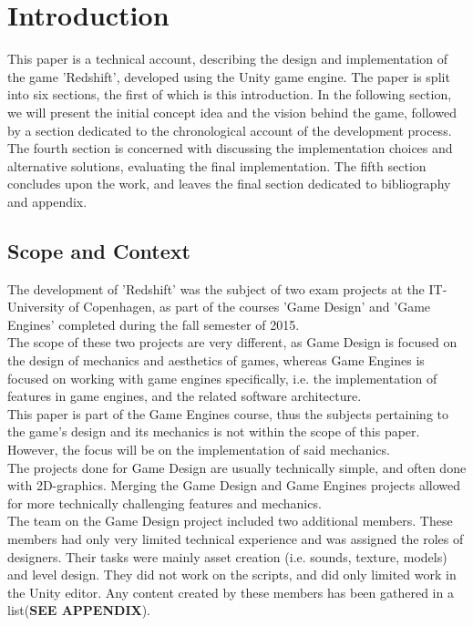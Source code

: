 \section{Introduction}
 This paper is a technical account, describing the design and implementation of the game 'Redshift', developed using the Unity game engine. The paper is split into six sections, the first of which is this introduction. In the following section, we will present the initial concept idea and the vision behind the game, followed by a section dedicated to the chronological account of the development process. The fourth section is concerned with discussing the implementation choices and alternative solutions, evaluating the final implementation. The fifth section concludes upon the work, and leaves the final section dedicated to bibliography and appendix.
 
\subsection{Scope and Context}
The development of 'Redshift' was the subject of two exam projects at the IT-University of Copenhagen, as part of the courses 'Game Design' and 'Game Engines' completed during the fall semester of 2015.\\

The scope of these two projects are very different, as Game Design is focused on the design of mechanics and aesthetics of games, whereas Game Engines is focused on working with game engines specifically, i.e. the implementation of features in game engines, and the related software architecture.\\

This paper is part of the Game Engines course, thus the subjects pertaining to the game's design and its mechanics is not within the scope of this paper. However, the focus will be on the implementation of said mechanics.\\

The projects done for Game Design are usually technically simple, and often done with 2D-graphics. Merging the Game Design and Game Engines projects allowed for more technically challenging features and mechanics.\\

The team on the Game Design project included two additional members. These members had only very limited technical experience and was assigned the roles of designers. Their tasks were mainly asset creation (i.e. sounds, texture, models) and level design. They did not work on the scripts, and did only limited work in the Unity editor. Any content created by these members has been gathered in a list(\textbf{SEE APPENDIX}).



